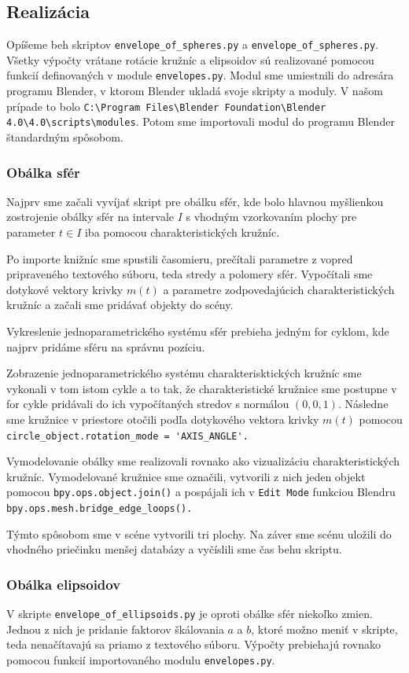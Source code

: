 \subsection{Realizácia}
Opíšeme beh skriptov \verb|envelope_of_spheres.py| a \verb|envelope_of_spheres.py|. Všetky výpočty vrátane rotácie kružníc a elipsoidov sú realizované pomocou funkcií definovaných v module \verb|envelopes.py|. Modul sme umiestnili do adresára programu Blender, v ktorom Blender ukladá svoje skripty a moduly. V našom prípade to bolo \verb|C:\Program Files\Blender Foundation\Blender 4.0\4.0\scripts\modules|. Potom sme importovali modul do programu Blender štandardným spôsobom. 
\subsubsection*{Obálka sfér}
Najprv sme začali vyvíjať skript pre obálku sfér, kde bolo hlavnou myšlienkou zostrojenie obálky sfér na intervale $I$ s vhodným vzorkovaním plochy pre parameter $t \in I$ iba pomocou charakteristických kružníc. 

Po importe knižníc sme spustili časomieru, prečítali parametre z vopred pripraveného textového súboru, teda stredy a polomery sfér. Vypočítali sme dotykové vektory krivky $m(t)$ a parametre zodpovedajúcich charakteristických kružníc a začali sme pridávať objekty do scény. 

Vykreslenie jednoparametrického systému sfér prebieha jedným for cyklom, kde najprv pridáme sféru na správnu pozíciu.

Zobrazenie jednoparametrického systému charakterisktických kružníc sme vykonali v tom istom cykle a to tak, že charakteristické kružnice sme postupne v for cykle pridávali do ich vypočítaných stredov s normálou $(0,0,1). $ Následne sme kružnice v priestore otočili podľa dotykového vektora krivky $m(t)$ pomocou \verb|circle_object.rotation_mode = 'AXIS_ANGLE'.|

Vymodelovanie obálky sme realizovali rovnako ako vizualizáciu charakteristických kružníc. Vymodelované kružnice sme označili, vytvorili z nich jeden objekt pomocou \verb|bpy.ops.object.join()| a pospájali ich v \verb|Edit Mode| funkciou Blendru \verb|bpy.ops.mesh.bridge_edge_loops().| 


Týmto spôsobom sme v scéne vytvorili tri plochy. Na záver sme scénu uložili do vhodného priečinku menšej databázy a vyčíslili sme čas behu skriptu.

\subsubsection*{Obálka elipsoidov}
V skripte \verb|envelope_of_ellipsoids.py| je oproti obálke sfér niekoľko zmien. Jednou z nich je pridanie faktorov škálovania $a$ a $b$, ktoré možno meniť v skripte, teda nenačítavajú sa priamo z textového súboru. Výpočty prebiehajú rovnako pomocou funkcií importovaného modulu \verb|envelopes.py|.

